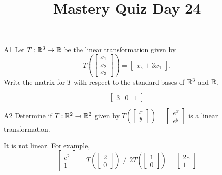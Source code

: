 \documentclass{sbgLAquiz}
\title{Mastery Quiz Day 24 }
\begin{document}
\begin{problem}{A1}
Let $T: \mathbb{R}^3 \rightarrow \mathbb{R}$ be the linear transformation given by $$T\left(\begin{bmatrix} x_1 \\ x_2 \\ x_3  \end{bmatrix} \right) = \begin{bmatrix} x_3+3x_1 \end{bmatrix}.$$ Write the matrix for $T$ with respect to the standard bases of $\mathbb{R}^3$ and $\mathbb{R}$.
\end{problem}
\begin{solution}
$$\begin{bmatrix} 3 & 0 & 1 \end{bmatrix}$$
\end{solution}
\begin{problem}{A2} 
 Determine if $T: \mathbb{R}^2 \rightarrow \mathbb{R}^2$ given by $T\left(\begin{bmatrix} x \\ y \end{bmatrix}\right) = \begin{bmatrix} e^{x} \\ e^y \end{bmatrix}$ is a linear transformation.
\end{problem}
\begin{solution}
It is not linear.  For example, $$\begin{bmatrix}e^2 \\ 1 \end{bmatrix} = T\left(\begin{bmatrix} 2 \\ 0 \end{bmatrix} \right) \neq 2 T\left(\begin{bmatrix} 1 \\ 0 \end{bmatrix}\right)=\begin{bmatrix} 2e \\ 1 \end{bmatrix}$$
\end{solution}
\end{document}
